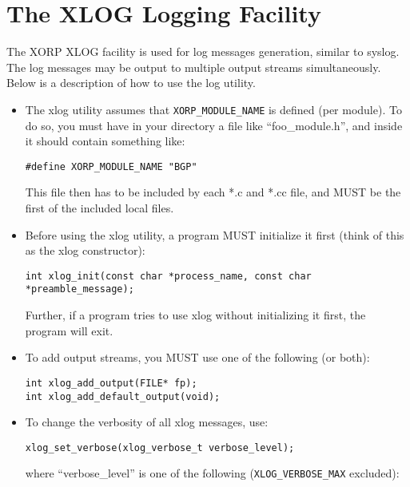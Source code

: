 \documentclass[11pt]{article}
\begin{document}
\newpage

\section{The XLOG Logging Facility}
\label{xlog}

The XORP XLOG facility is used for log messages generation, similar to
syslog. The log messages may be output to multiple output streams
simultaneously. Below is a description of how to use the log utility.

\begin{itemize}

  \item The xlog utility assumes that \verb=XORP_MODULE_NAME= is defined
   (per module). To do so, you must have in your directory a file like
   ``foo\_module.h'', and inside it should contain something like:

\begin{verbatim}
#define XORP_MODULE_NAME "BGP"
\end{verbatim}

   This file then has to be included by each *.c and *.cc file,
   and MUST be the first of the included local files.

  \item Before using the xlog utility, a program MUST initialize it
   first (think of this as the xlog constructor):

\begin{verbatim}
int xlog_init(const char *process_name, const char *preamble_message);
\end{verbatim}

   Further, if a program tries to use xlog without initializing it
   first, the program will exit.

  \item To add output streams, you MUST use one of the following (or both):

\begin{verbatim}
int xlog_add_output(FILE* fp);
int xlog_add_default_output(void);
\end{verbatim}

  \item To change the verbosity of all xlog messages, use:

\begin{verbatim}
xlog_set_verbose(xlog_verbose_t verbose_level);
\end{verbatim}

   where ``verbose\_level'' is one of the following (\verb=XLOG_VERBOSE_MAX=
   excluded):


\end{itemize}
\end{document}
